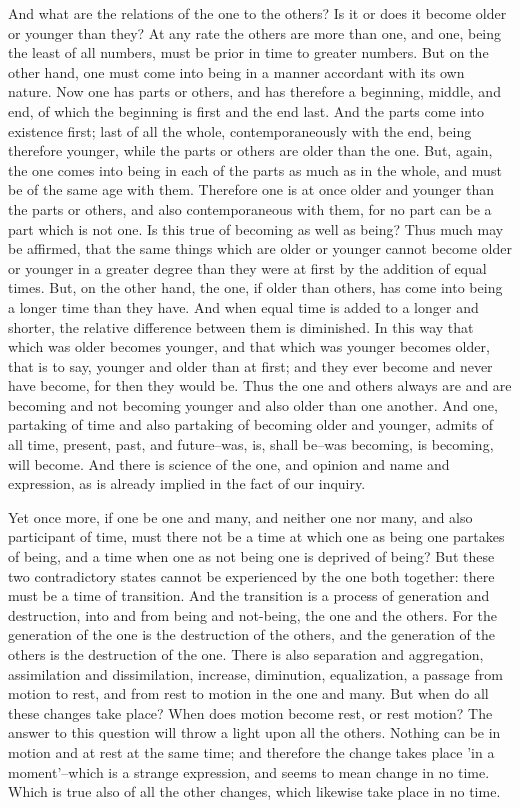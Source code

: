 And what are the relations of the one to the others? Is it or does it
become older or younger than they? At any rate the others are more than
one, and one, being the least of all numbers, must be prior in time to
greater numbers. But on the other hand, one must come into being in a
manner accordant with its own nature. Now one has parts or others, and
has therefore a beginning, middle, and end, of which the beginning is
first and the end last. And the parts come into existence first; last of
all the whole, contemporaneously with the end, being therefore younger,
while the parts or others are older than the one. But, again, the one
comes into being in each of the parts as much as in the whole, and must
be of the same age with them. Therefore one is at once older and younger
than the parts or others, and also contemporaneous with them, for no
part can be a part which is not one. Is this true of becoming as well as
being? Thus much may be affirmed, that the same things which are older
or younger cannot become older or younger in a greater degree than they
were at first by the addition of equal times. But, on the other hand,
the one, if older than others, has come into being a longer time than
they have. And when equal time is added to a longer and shorter, the
relative difference between them is diminished. In this way that which
was older becomes younger, and that which was younger becomes older,
that is to say, younger and older than at first; and they ever become
and never have become, for then they would be. Thus the one and others
always are and are becoming and not becoming younger and also older than
one another. And one, partaking of time and also partaking of becoming
older and younger, admits of all time, present, past, and future--was,
is, shall be--was becoming, is becoming, will become. And there is
science of the one, and opinion and name and expression, as is already
implied in the fact of our inquiry.

Yet once more, if one be one and many, and neither one nor many, and
also participant of time, must there not be a time at which one as being
one partakes of being, and a time when one as not being one is deprived
of being? But these two contradictory states cannot be experienced
by the one both together: there must be a time of transition. And the
transition is a process of generation and destruction, into and from
being and not-being, the one and the others. For the generation of the
one is the destruction of the others, and the generation of the others
is the destruction of the one. There is also separation and aggregation,
assimilation and dissimilation, increase, diminution, equalization,
a passage from motion to rest, and from rest to motion in the one and
many. But when do all these changes take place? When does motion become
rest, or rest motion? The answer to this question will throw a light
upon all the others. Nothing can be in motion and at rest at the same
time; and therefore the change takes place 'in a moment'--which is a
strange expression, and seems to mean change in no time. Which is true
also of all the other changes, which likewise take place in no time.

